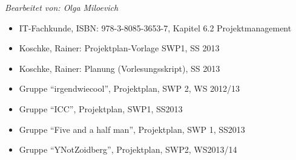 \textit{Bearbeitet von: Olga Miloevich}

\begin{itemize}
  \item IT-Fachkunde, ISBN: 978-3-8085-3653-7, Kapitel 6.2 Projektmanagement
  \item Koschke, Rainer: Projektplan-Vorlage SWP1, SS 2013
  \item Koschke, Rainer: Planung (Vorlesungsskript), SS 2013
  \item Gruppe ``irgendwiecool'', Projektplan, SWP 2, WS 2012/13
  \item Gruppe ``ICC'', Projektplan, SWP1, SS2013
  \item Gruppe ``Five and a half man'', Projektplan, SWP 1, SS2013
  \item Gruppe ``YNotZoidberg'', Projektplan, SWP2, WS2013/14
  \end{itemize}

